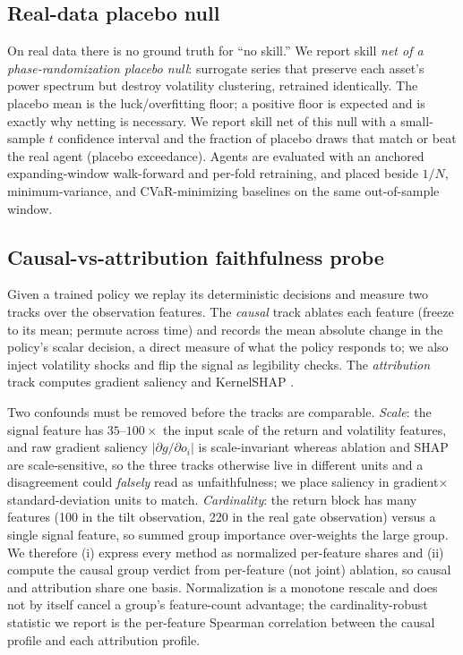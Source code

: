 \documentclass[sigconf,anonymous,review]{acmart}
\begin{document}
\subsection{Real-data placebo null}
On real data there is no ground truth for ``no skill.'' We report skill \emph{net of
a phase-randomization placebo null}: surrogate series that preserve each asset's
power spectrum but destroy volatility clustering, retrained identically. The placebo
mean is the luck/overfitting floor; a positive floor is expected and is exactly why
netting is necessary. We report skill net of this null with a small-sample $t$
confidence interval and the fraction of placebo draws that match or beat the real
agent (placebo exceedance). Agents are evaluated with an anchored expanding-window
walk-forward and per-fold retraining, and placed beside $1/N$, minimum-variance, and
CVaR-minimizing baselines on the same out-of-sample window.

\subsection{Causal-vs-attribution faithfulness probe}\label{sec:probe}
Given a trained policy we replay its deterministic decisions and measure two tracks
over the observation features. The \emph{causal} track ablates each feature (freeze
to its mean; permute across time) and records the mean absolute change in the
policy's scalar decision, a direct measure of what the policy responds to; we also
inject volatility shocks and flip the signal as legibility checks. The
\emph{attribution} track computes gradient saliency \cite{simonyan2014} and
KernelSHAP \cite{lundberg2017}.

Two confounds must be removed before the tracks are comparable. \emph{Scale}: the
signal feature has $35$--$100\times$ the input scale of the return and volatility
features, and raw gradient saliency $\lvert\partial g/\partial o_i\rvert$ is
scale-invariant whereas ablation and SHAP are scale-sensitive, so the three tracks
otherwise live in different units and a disagreement could \emph{falsely} read as
unfaithfulness; we place saliency in gradient$\times$standard-deviation units to
match. \emph{Cardinality}: the return block has many features (100 in the tilt
observation, 220 in the real gate observation) versus a single signal feature, so
summed group importance over-weights the large group. We therefore (i) express every
method as normalized per-feature shares and (ii) compute the causal group verdict
from per-feature (not joint) ablation, so causal and attribution share one basis.
Normalization is a monotone rescale and does not by itself cancel a group's
feature-count advantage; the cardinality-robust statistic we report is the
per-feature Spearman correlation between the causal profile and each attribution
profile.
\end{document}
